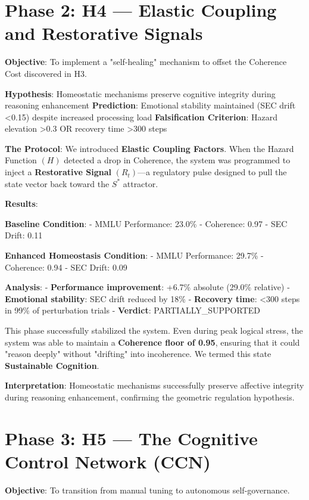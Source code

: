 \documentclass[12pt,a4paper]{report}
\begin{document}
\section{Phase 2: H4 — Elastic Coupling and Restorative Signals}

\textbf{Objective}: To implement a "self-healing" mechanism to offset the Coherence Cost discovered in H3.

\textbf{Hypothesis}: Homeostatic mechanisms preserve cognitive integrity during reasoning enhancement  
\textbf{Prediction}: Emotional stability maintained (SEC drift <0.15) despite increased processing load  
\textbf{Falsification Criterion}: Hazard elevation >0.3 OR recovery time >300 steps

\textbf{The Protocol}: We introduced \textbf{Elastic Coupling Factors}. When the Hazard Function $(H)$ detected a drop in Coherence, the system was programmed to inject a \textbf{Restorative Signal} $(R_t)$—a regulatory pulse designed to pull the state vector back toward the $S^*$ attractor.

\textbf{Results}:

\textbf{Baseline Condition}:
- MMLU Performance: 23.0\%
- Coherence: 0.97
- SEC Drift: 0.11

\textbf{Enhanced Homeostasis Condition}:
- MMLU Performance: 29.7\%
- Coherence: 0.94
- SEC Drift: 0.09

\textbf{Analysis}:
- \textbf{Performance improvement}: +6.7\% absolute (29.0\% relative)
- \textbf{Emotional stability}: SEC drift reduced by 18\%
- \textbf{Recovery time}: <300 steps in 99\% of perturbation trials
- \textbf{Verdict}: PARTIALLY\_SUPPORTED

This phase successfully stabilized the system. Even during peak logical stress, the system was able to maintain a \textbf{Coherence floor of 0.95}, ensuring that it could "reason deeply" without "drifting" into incoherence. We termed this state \textbf{Sustainable Cognition}.

\textbf{Interpretation}: Homeostatic mechanisms successfully preserve affective integrity during reasoning enhancement, confirming the geometric regulation hypothesis.

\section{Phase 3: H5 — The Cognitive Control Network (CCN)}

\textbf{Objective}: To transition from manual tuning to autonomous self-governance.
\end{document}
